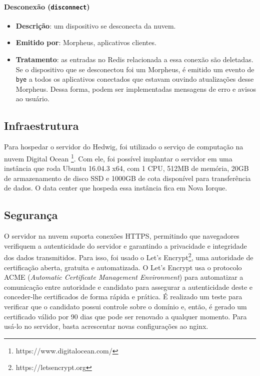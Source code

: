 \paragraph{Desconexão (\texttt{disconnect})}
\begin{itemize}
\item \textbf{Descrição}: um dispositivo se desconecta da nuvem.
\item \textbf{Emitido por}: Morpheus, aplicativos clientes.
\item \textbf{Tratamento}: as entradas no Redis relacionada a essa conexão são deletadas. Se o dispositivo que se desconectou foi um Morpheus, é emitido um evento de \texttt{bye} a todos os aplicativos conectados que estavam ouvindo atualizações desse Morpheus. Dessa forma, podem ser implementadas mensagens de erro e avisos ao usuário.
\end{itemize}

\subsection{Infraestrutura}

Para hospedar o servidor do Hedwig, foi utilizado o serviço de computação na nuvem Digital Ocean \footnote{https://www.digitalocean.com/}. Com ele, foi possível implantar o servidor em uma instância que roda Ubuntu 16.04.3 x64, com 1 CPU, 512MB de memória, 20GB de armazenamento de disco SSD e 1000GB de cota disponível para transferência de dados. O data center que hospeda essa instância fica em Nova Iorque.

\subsection{Segurança}

O servidor na nuvem suporta conexões HTTPS, permitindo que navegadores verifiquem a autenticidade do servidor e garantindo a privacidade e integridade dos dados transmitidos. Para isso, foi usado o Let's Encrypt\footnote{https://letsencrypt.org}, uma autoridade de certificação aberta, gratuita e automatizada. O Let's Encrypt usa o protocolo ACME (\emph{Automatic Certificate Management Environment}) para automatizar a comunicação entre autoridade e candidato para assegurar a autenticidade deste e conceder-lhe certificados de forma rápida e prática. É realizado um teste para verificar que o candidato possui controle sobre o domínio e, então, é gerado um certificado válido por 90 dias que pode ser renovado a qualquer momento. Para usá-lo no servidor, basta acrescentar novas configurações ao nginx.


